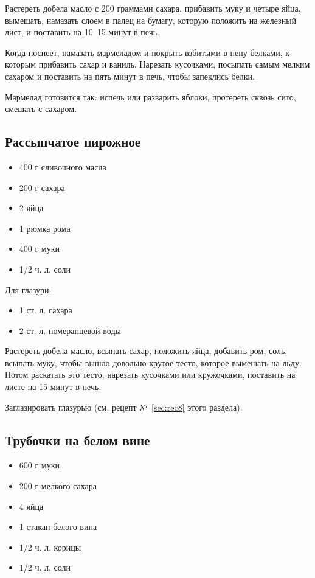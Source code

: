 Растереть добела масло с 200 граммами сахара, прибавить муку и четыре яйца, вымешать, намазать слоем в палец на бумагу, которую положить на железный лист, и поставить на 10–15 минут в печь.

Когда поспеет, намазать мармеладом и покрыть взбитыми в пену белками, к которым прибавить сахар и ваниль. Нарезать кусочками, посыпать самым мелким сахаром и поставить на пять минут в печь, чтобы запеклись белки.

Мармелад готовится так: испечь или разварить яблоки, протереть сквозь сито, смешать с сахаром.

\subsection{Рассыпчатое пирожное}

\begin{itemize}
	\item 400 г сливочного масла 
    \item 200 г сахара 
    \item 2 яйца 
    \item 1 рюмка рома 
    \item 400 г муки 
    \item 1/2 ч. л. соли
\end{itemize}

Для глазури: 

\begin{itemize}
	\item 1 ст. л. сахара 
    \item 2 ст. л. померанцевой воды
\end{itemize}

Растереть добела масло, всыпать сахар, положить яйца, добавить ром, соль, всыпать муку, чтобы вышло довольно крутое тесто, которое вымешать на льду. Потом раскатать это тесто, нарезать кусочками или кружочками, поставить на листе на 15 минут в печь.

Заглазировать глазурью (см. рецепт №~\ref{sec:rec8} этого раздела).

\subsection{Трубочки на белом вине}

\begin{itemize}
	\item 600 г муки
    \item 200 г мелкого сахара 
    \item 4 яйца 
    \item 1 стакан белого вина
    \item 1/2 ч. л. корицы
    \item 1/2 ч. л. соли
\end{itemize}


